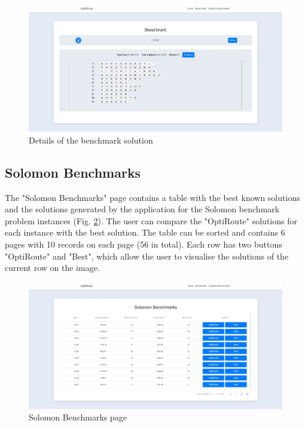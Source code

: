 \documentclass[a4paper,twoside,12pt]{book}
\begin{document}
\begin{figure}[H]
\centering
\includegraphics[scale=0.3]{images/benchmarkSolved.jpg}
\caption{Details of the benchmark solution}
\label{fig:benchmarkSolved}
\end{figure}

\subsection{Solomon Benchmarks}

The "Solomon Benchmarks" page contains a table with the best known solutions and the solutions generated by the application for the Solomon benchmark problem instances (Fig. \ref{fig:solomonBenchmark}). The user can compare the "OptiRoute" solutions for each instance with the best solution. The table can be sorted and contains 6 pages with 10 records on each page (56 in total). Each row has two buttons "OptiRoute" and "Best", which allow the user to visualise the solutions of the current row on the image.

\begin{figure}[H]
\centering
\includegraphics[scale=0.3]{images/solomonBenchmark.jpg}
\caption{Solomon Benchmarks page}
\label{fig:solomonBenchmark}
\end{figure}
\end{document}
